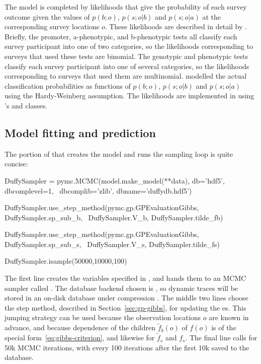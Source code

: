 \documentclass[article]{jss}
\begin{document}
The model is completed by likelihoods that give the probability of each survey outcome given the values of $p(b;o)$, $p(s;o|b)$ and $p(s;o|a)$ at the corresponding survey locations $o$. These likelihoods are described in detail by \cite{Howes}. Briefly, the promoter, a-phenotypic, and b-phenotypic tests all classify each survey participant into one of two categories, so the likelihoods corresponding to surveys that used these tests are binomial. The genotypic and phenotypic tests classify each survey participant into one of several categories, so the likelihoods corresponding to surveys that used them are multinomial. \cite{Howes} modelled the actual classification probabilities as functions of $p(b;o)$, $p(s;o|b)$ and $p(s;o|a)$ using the Hardy-Weinberg assumption. The likelihoods are implemented in  using 's  and  classes.

\subsection{Model fitting and prediction}
The portion of  that creates the model and runs the sampling loop is quite concise: 
\begin{CodeInput}
DuffySampler = pymc.MCMC(model.make_model(**data), db='hdf5', dbcomplevel=1, \
    dbcomplib='zlib', dbname='duffydb.hdf5')

DuffySampler.use_step_method(pymc.gp.GPEvaluationGibbs, DuffySampler.sp_sub_b, \
    DuffySampler.V_b, DuffySampler.tilde_fb)

DuffySampler.use_step_method(pymc.gp.GPEvaluationGibbs, DuffySampler.sp_sub_s, \
    DuffySampler.V_s, DuffySampler.tilde_fs)

DuffySampler.isample(50000,10000,100)    
\end{CodeInput}
The first line creates the variables specified in , and hands them to an MCMC sampler called . The database backend chosen is , so dynamic traces will be stored in an on-disk  database under compression \citep{pymc}. The middle two lines choose the  step method, described in Section~\ref{sec:gp-gibbs}, for updating the es. This jumping strategy can be used because the observation locations $o$ are known in advance, and because dependence of the children $\tilde f_b(o)$ of $f(o)$ is of the special form~\ref{eq:gibbs-criterion}, and likewise for $\tilde f_s$ and $f_s$. The final line calls for 50k MCMC iterations, with every 100 iterations after the first 10k saved to the database. 
\end{document}
